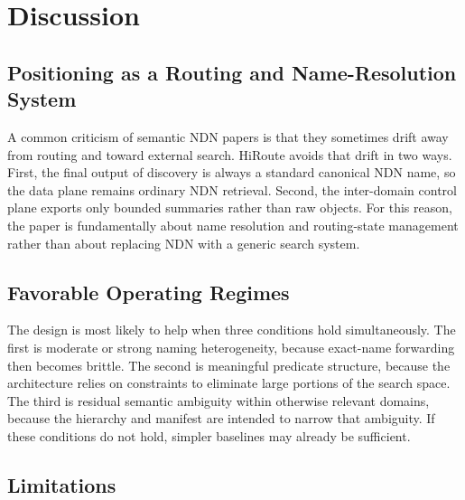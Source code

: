 \documentclass[journal]{IEEEtran}
\newcommand{\sysname}{HiRoute}
\begin{document}
\section{Discussion}

\subsection{Positioning as a Routing and Name-Resolution System}

A common criticism of semantic NDN papers is that they sometimes drift away from routing and toward external search. \sysname{} avoids that drift in two ways. First, the final output of discovery is always a standard canonical NDN name, so the data plane remains ordinary NDN retrieval. Second, the inter-domain control plane exports only bounded summaries rather than raw objects. For this reason, the paper is fundamentally about name resolution and routing-state management rather than about replacing NDN with a generic search system.

\subsection{Favorable Operating Regimes}

The design is most likely to help when three conditions hold simultaneously. The first is moderate or strong naming heterogeneity, because exact-name forwarding then becomes brittle. The second is meaningful predicate structure, because the architecture relies on constraints to eliminate large portions of the search space. The third is residual semantic ambiguity within otherwise relevant domains, because the hierarchy and manifest are intended to narrow that ambiguity. If these conditions do not hold, simpler baselines may already be sufficient.

\subsection{Limitations}
\label{sec:limitations}
\end{document}
